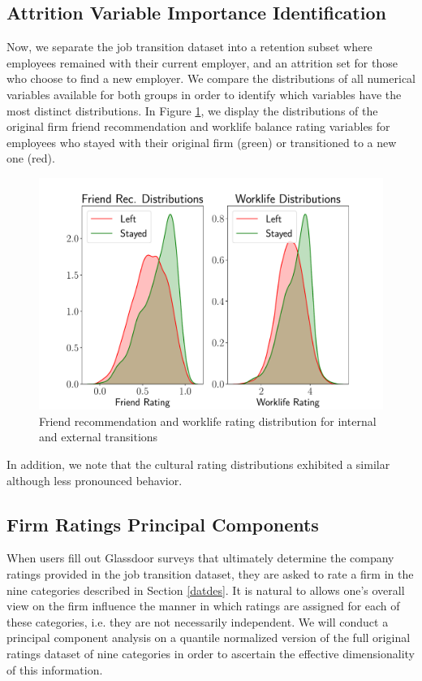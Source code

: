 \documentclass[10pt]{article}
\begin{document}
\subsection{Attrition Variable Importance Identification}
\hspace{\parindent}
Now, we separate the job transition  dataset into a retention subset 
where employees remained with their current employer, and an attrition set for those who 
choose to find a new employer. We compare the distributions of all 
numerical variables available for both groups 
in order to identify which variables have the most distinct 
distributions.  In Figure \ref{fig:discdist}, we display the 
distributions of the original firm friend recommendation and 
worklife balance rating variables for employees who 
stayed with their original firm (green) or transitioned to a new one (red). 
%
\begin{figure}[thb]
    \centering
	\includegraphics[width=1.0\linewidth]{discdist.pdf}
	\caption{Friend recommendation and worklife rating distribution for internal 
    and external transitions}
	\label{fig:discdist}
\end{figure}
%
In addition, we note that the cultural rating distributions exhibited a similar 
although less pronounced behavior.  

\subsection{Firm Ratings Principal Components}\label{pcasec}
\hspace{\parindent}
When users fill out Glassdoor surveys that ultimately determine the 
company ratings provided in the job transition dataset, they are asked to 
rate a firm in the nine categories described in Section \ref{datdes}.
It is natural to allows one's overall view on the firm influence 
the manner in which ratings are assigned for each of these
categories, i.e. they are not necessarily independent.  We will 
conduct a principal component analysis on a quantile normalized 
version of the full original ratings dataset of nine categories in 
order to ascertain the effective dimensionality of this information. 
\end{document}
